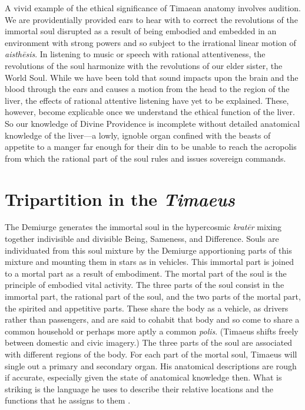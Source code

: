 
A vivid example of the ethical significance of Timaean anatomy involves audition. We are providentially provided ears to hear with to correct the revolutions of the immortal soul disrupted as a result of being embodied and embedded in an environment with strong powers and so subject to the irrational linear motion of \emph{aisthēsis}. In listening to music or speech with rational attentiveness, the revolutions of the soul harmonize with the revolutions of our elder sister, the World Soul. While we have been told that sound impacts upon the brain and the blood through the ears and causes a motion from the head to the region of the liver, the effects of rational attentive listening have yet to be explained. These, however, become explicable once we understand the ethical function of the liver. So our knowledge of Divine Providence is incomplete without detailed anatomical knowledge of the liver---a lowly, ignoble organ confined with the beasts of appetite to a manger far enough for their din to be unable to reach the acropolis from which the rational part of the soul rules and issues sovereign commands.


\section{Tripartition in the \emph{Timaeus}} %
\label{sec:tripartition_in_the_emph_timaeus}

The Demiurge generates the immortal soul in the hypercosmic \emph{kratēr} mixing together indivisible and divisible Being, Sameness, and Difference. Souls are individuated from this soul mixture by the Demiurge apportioning parts of this mixture and mounting them in stars as in vehicles. This immortal part is joined to a mortal part as a result of embodiment. The mortal part of the soul is the principle of embodied vital activity. The three parts of the soul consist in the immortal part, the rational part of the soul, and the two parts of the mortal part, the spirited and appetitive parts. These share the body as a vehicle, as drivers rather than passengers, and are said to cohabit that body and so come to share a common household or perhaps more aptly a common \emph{polis}. (Timaeus shifts freely between domestic and civic imagery.) The three parts of the soul are associated with different regions of the body. For each part of the mortal soul, Timaeus will single out a primary and secondary organ. His anatomical descriptions are rough if accurate, especially given the state of anatomical knowledge then. What is striking is the language he uses to describe their relative locations and the functions that he assigns to them \citep{Steel:2001ay}. 

